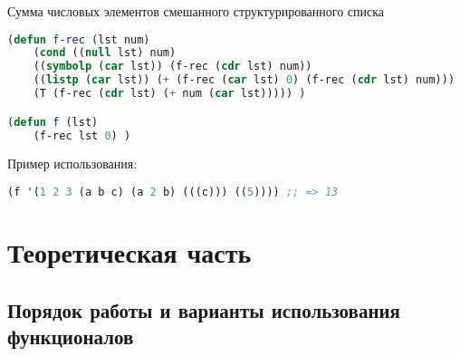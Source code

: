 \documentclass[a4paper,oneside,12pt]{extreport}
\begin{document}
\begin{task}
    Сумма числовых элементов смешанного структурированного списка
    \begin{lstlisting}[language=Lisp] 
(defun f-rec (lst num)
	(cond ((null lst) num)
	((symbolp (car lst)) (f-rec (cdr lst) num))
	((listp (car lst)) (+ (f-rec (car lst) 0) (f-rec (cdr lst) num)))
	(T (f-rec (cdr lst) (+ num (car lst))))) )

(defun f (lst)
	(f-rec lst 0) )   
    \end{lstlisting}

    Пример использования:
    \begin{lstlisting}[language=Lisp]    
(f '(1 2 3 (a b c) (a 2 b) (((c))) ((5)))) ;; => 13
    \end{lstlisting}
\end{task}


\newpage

\section*{Теоретическая часть}

\subsection*{Порядок работы и варианты использования функционалов}
\end{document}
